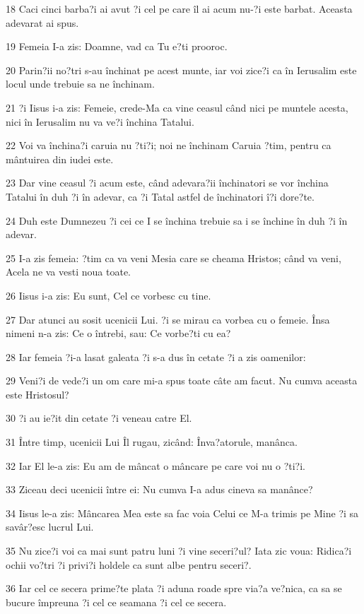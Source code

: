 \par 18 Caci cinci barba?i ai avut ?i cel pe care îl ai acum nu-?i este barbat. Aceasta adevarat ai spus.
\par 19 Femeia I-a zis: Doamne, vad ca Tu e?ti prooroc.
\par 20 Parin?ii no?tri s-au închinat pe acest munte, iar voi zice?i ca în Ierusalim este locul unde trebuie sa ne închinam.
\par 21 ?i Iisus i-a zis: Femeie, crede-Ma ca vine ceasul când nici pe muntele acesta, nici în Ierusalim nu va ve?i închina Tatalui.
\par 22 Voi va închina?i caruia nu ?ti?i; noi ne închinam Caruia ?tim, pentru ca mântuirea din iudei este.
\par 23 Dar vine ceasul ?i acum este, când adevara?ii închinatori se vor închina Tatalui în duh ?i în adevar, ca ?i Tatal astfel de închinatori î?i dore?te.
\par 24 Duh este Dumnezeu ?i cei ce I se închina trebuie sa i se închine în duh ?i în adevar.
\par 25 I-a zis femeia: ?tim ca va veni Mesia care se cheama Hristos; când va veni, Acela ne va vesti noua toate.
\par 26 Iisus i-a zis: Eu sunt, Cel ce vorbesc cu tine.
\par 27 Dar atunci au sosit ucenicii Lui. ?i se mirau ca vorbea cu o femeie. Însa nimeni n-a zis: Ce o întrebi, sau: Ce vorbe?ti cu ea?
\par 28 Iar femeia ?i-a lasat galeata ?i s-a dus în cetate ?i a zis oamenilor:
\par 29 Veni?i de vede?i un om care mi-a spus toate câte am facut. Nu cumva aceasta este Hristosul?
\par 30 ?i au ie?it din cetate ?i veneau catre El.
\par 31 Între timp, ucenicii Lui Îl rugau, zicând: Înva?atorule, manânca.
\par 32 Iar El le-a zis: Eu am de mâncat o mâncare pe care voi nu o ?ti?i.
\par 33 Ziceau deci ucenicii între ei: Nu cumva I-a adus cineva sa manânce?
\par 34 Iisus le-a zis: Mâncarea Mea este sa fac voia Celui ce M-a trimis pe Mine ?i sa savâr?esc lucrul Lui.
\par 35 Nu zice?i voi ca mai sunt patru luni ?i vine seceri?ul? Iata zic voua: Ridica?i ochii vo?tri ?i privi?i holdele ca sunt albe pentru seceri?.
\par 36 Iar cel ce secera prime?te plata ?i aduna roade spre via?a ve?nica, ca sa se bucure împreuna ?i cel ce seamana ?i cel ce secera.
